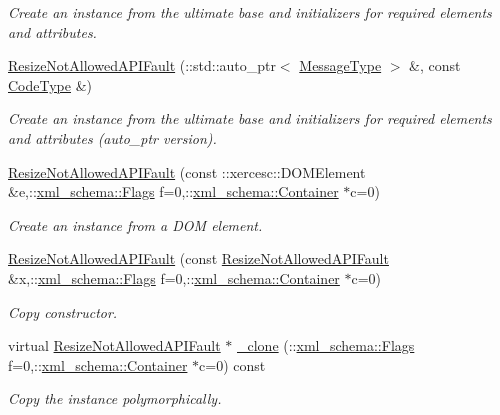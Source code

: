\begin{DoxyCompactItemize}
\begin{DoxyCompactList}\small\item\em Create an instance from the ultimate base and initializers for required elements and attributes. \item\end{DoxyCompactList}\item 
\hyperlink{classopenstack_1_1xml_1_1ResizeNotAllowedAPIFault_aff159c20d7c8212cd0042ced21776710}{ResizeNotAllowedAPIFault} (::std::auto\_\-ptr$<$ \hyperlink{classopenstack_1_1xml_1_1CloudServersAPIFault_aff7b9d2067747fa033a0ea4408011af6}{MessageType} $>$ \&, const \hyperlink{classopenstack_1_1xml_1_1CloudServersAPIFault_aa9f350c9dba08ae375b2a61568551550}{CodeType} \&)
\begin{DoxyCompactList}\small\item\em Create an instance from the ultimate base and initializers for required elements and attributes (auto\_\-ptr version). \item\end{DoxyCompactList}\item 
\hyperlink{classopenstack_1_1xml_1_1ResizeNotAllowedAPIFault_aefcee8941ca8d717dbd21c7cba00ff55}{ResizeNotAllowedAPIFault} (const ::xercesc::DOMElement \&e,::\hyperlink{namespacexml__schema_affb4c227cbd9aa7453dd1dc5a1401943}{xml\_\-schema::Flags} f=0,::\hyperlink{namespacexml__schema_a333dea2213742aea47a37532dec4ec27}{xml\_\-schema::Container} $\ast$c=0)
\begin{DoxyCompactList}\small\item\em Create an instance from a DOM element. \item\end{DoxyCompactList}\item 
\hyperlink{classopenstack_1_1xml_1_1ResizeNotAllowedAPIFault_a6e35c1d8f456e49825f8391a42816b9d}{ResizeNotAllowedAPIFault} (const \hyperlink{classopenstack_1_1xml_1_1ResizeNotAllowedAPIFault}{ResizeNotAllowedAPIFault} \&x,::\hyperlink{namespacexml__schema_affb4c227cbd9aa7453dd1dc5a1401943}{xml\_\-schema::Flags} f=0,::\hyperlink{namespacexml__schema_a333dea2213742aea47a37532dec4ec27}{xml\_\-schema::Container} $\ast$c=0)
\begin{DoxyCompactList}\small\item\em Copy constructor. \item\end{DoxyCompactList}\item 
virtual \hyperlink{classopenstack_1_1xml_1_1ResizeNotAllowedAPIFault}{ResizeNotAllowedAPIFault} $\ast$ \hyperlink{classopenstack_1_1xml_1_1ResizeNotAllowedAPIFault_a70f296bcc1438fc5f14b47a14098a111}{\_\-clone} (::\hyperlink{namespacexml__schema_affb4c227cbd9aa7453dd1dc5a1401943}{xml\_\-schema::Flags} f=0,::\hyperlink{namespacexml__schema_a333dea2213742aea47a37532dec4ec27}{xml\_\-schema::Container} $\ast$c=0) const 
\begin{DoxyCompactList}\small\item\em Copy the instance polymorphically. \item\end{DoxyCompactList}\end{DoxyCompactItemize}


